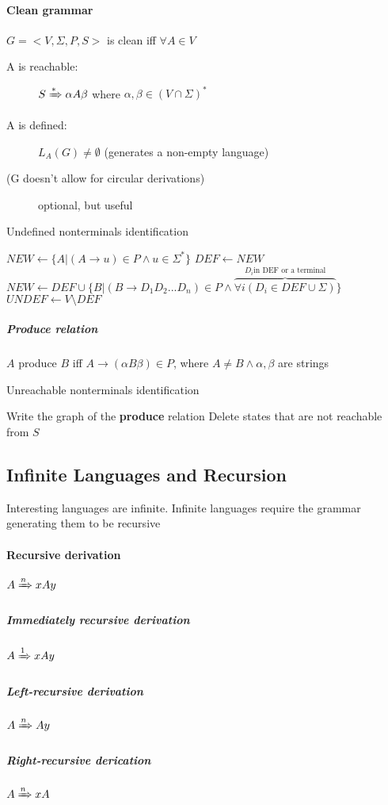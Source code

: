 \documentclass{article}
\begin{document}
\paragraph{Clean grammar} $G=<V,\Sigma, P, S>$ is clean iff $\forall A \in V$
\begin{description}
\item[A is reachable:] $S \xRightarrow{*} \alpha A \beta$ where $\alpha , \beta \in (V \cap \Sigma)^*$
\item[A is defined:] $L_A(G)\neq \emptyset$ (generates a non-empty language)
\item[(G doesn't allow for circular derivations)] optional, but useful
\end{description}
\begin{algorithm}[h!]
\caption{Undefined nonterminals identification}
\begin{algorithmic}
\STATE $NEW \leftarrow \{A|(A\rightarrow u) \in P \wedge u \in \Sigma^*\}$
\REPEAT
\STATE $DEF \leftarrow NEW$
\STATE $NEW \leftarrow DEF \cup \{B | (B \rightarrow D_1D_2...D_n)\in P \wedge \overbrace{\forall i(D_i\in DEF \cup \Sigma)}^{D_i \text{in DEF or a terminal}}\}$
\STATE $UNDEF \leftarrow V \setminus DEF$
\end{algorithmic}
\end{algorithm}
\subparagraph{Produce relation} $A$ produce $B$ iff $A \rightarrow (\alpha B \beta)\in P$, where $A \neq B \wedge \alpha, \beta$ are strings
\begin{algorithm}[h!]
\caption{Unreachable nonterminals identification}
\begin{algorithmic}
\STATE Write the graph of the \textbf{produce} relation
\STATE Delete states that are not reachable from $S$
\end{algorithmic}
\end{algorithm}

\subsection{Infinite Languages and Recursion} 
Interesting languages are infinite. Infinite languages require the grammar generating them to be recursive
\paragraph{Recursive derivation} $A \xRightarrow{n} xAy$ 
\subparagraph{Immediately recursive derivation} $A \xRightarrow{1} xAy$ 
\subparagraph{Left-recursive derivation} $A \xRightarrow{n} Ay$ 
\subparagraph{Right-recursive derication} $A \xRightarrow{n} xA$ 
\end{document}

